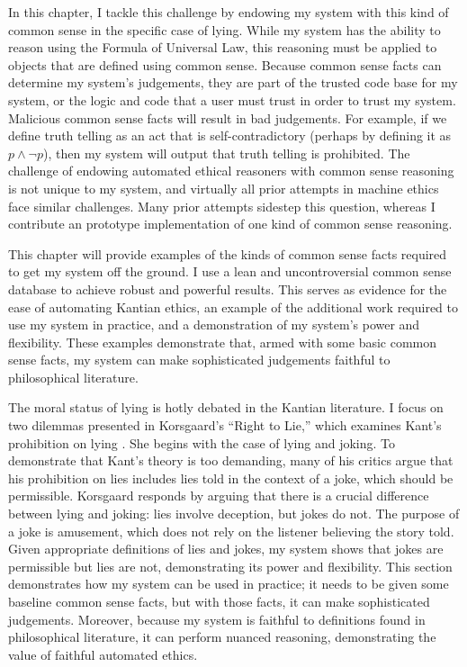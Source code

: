 \begin{isabellebody}
\begin{isamarkuptext}
In this chapter, I tackle this challenge by endowing my system with this kind of common sense in the 
specific case of lying. While my system has the ability to reason
using the Formula of Universal Law, this reasoning must be applied to objects that are defined
using common sense. Because common sense facts can determine my system's judgements, they are part of the trusted
code base for my system, or the logic and code that a user must trust in order to trust my system. 
Malicious common sense facts will result in bad judgements.
For example, if we define truth telling as an act that is self-contradictory (perhaps
by defining it as $p \wedge \neg p$), then my system will output that truth telling is prohibited.
The challenge of endowing automated ethical reasoners with common sense reasoning is not unique to my 
system, and virtually all prior attempts in machine ethics face similar challenges. Many prior attempts
sidestep this question, whereas I contribute an prototype implementation of one kind of common sense reasoning.

This chapter will provide examples of the kinds of common sense facts required to get my system
off the ground. I use a lean and uncontroversial common sense database
to achieve robust and powerful results. This serves as evidence for the ease of automating
Kantian ethics, an example of the additional work required to use my system in practice, and a 
demonstration of my system's power and flexibility. These examples demonstrate that, armed with some basic 
common sense facts, my system can make sophisticated judgements faithful to philosophical literature.%
\end{isamarkuptext}\isamarkuptrue%
%
\isadelimdocument
%
\endisadelimdocument
%
\isatagdocument
%
\isamarkuptrue%
%
\endisatagdocument
{\isafolddocument}%
%
\isadelimdocument
%
\endisadelimdocument
%
\begin{isamarkuptext}%
The moral status of lying is hotly debated in the Kantian literature. I focus on two dilemmas
presented in Korsgaard's ``Right to Lie,'' which 
examines Kant's prohibition on lying \citep{KorsgaardRTL}. She begins with the case of 
lying and joking. To demonstrate that Kant's theory is too demanding, many of his critics argue that 
his prohibition on lies includes lies told in the context of a joke, which should be permissible. Korsgaard responds by arguing 
that there is a crucial difference between lying and joking: lies involve deception, but jokes do not. 
The purpose of a joke is amusement, which does not rely on the listener believing the story told. 
Given appropriate definitions of lies and jokes, my system shows that jokes are permissible but lies 
are not, demonstrating its power and flexibility. This section demonstrates how my system can be used 
in practice; it needs to be given some baseline common sense facts, but with those facts, it can make 
sophisticated judgements. Moreover, because my system is faithful to definitions found in philosophical 
literature, it can perform nuanced reasoning, demonstrating the value of faithful automated ethics. 


\end{isamarkuptext}
\end{isabellebody}
